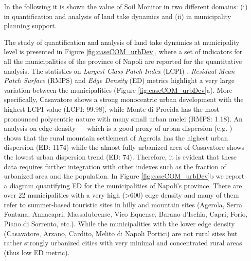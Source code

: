 \documentclass[APA,LATO1COL,doublespace]{WileyNJD-v2}
\begin{document}
In the following it is shown the value of Soil Monitor in two different domains: (i) in quantification and analysis of land take dynamics and (ii) in municipality planning support. 

The study of quantification and analysis of land take dynamics at municipality level is presented in Figure \ref{fig:caseCOM_urbDev}, where a set of indicators for all the municipalities of the province of Napoli are reported for the quantitative analysis.
The statistics on \textit{Largest Class Patch Index} (LCPI) , \textit{Residual Mean Patch Surface} (RMPS) and \textit{Edge Density} (ED) metrics highlight a very large variation between the municipalities (Figure \ref{fig:caseCOM_urbDev}a).
More specifically, Casavatore shows a strong monocentric urban development with the highest LCPI value (LCPI: 99.98), while Monte di Procida has the most pronounced
polycentric nature with many small urban nuclei (RMPS: 1.18).
An analysis on edge density --- which is a good proxy of urban dispersion (e.g. \citealp{SCHWARZ2010}) --- shows that the rural mountain settlement of Agerola has the highest urban dispersion (ED: 1174) while the almost fully urbanized area of Casavatore shows the lowest urban dispersion trend (ED: 74).
Therefore, it is evident that these data requires further integration with other indexes such as the fraction of urbanized area and the population.
In Figure \ref{fig:caseCOM_urbDev}b we report a diagram quantifying ED for the municipalities of Napoli's province.
There are over 22 municipalities with a very high (>600) edge density and many of them refer to summer-based touristic sites in hilly and mountain sites (Agerola, Serra Fontana, Annacapri, Massalubrense, Vico Equense, Barano d'Ischia, Capri, Forio, Piano di Sorrento, etc.).
While the municipalities with the lower edge density (Casavatore, Arzano, Cardito, Melito di Napoli Portici) are not rural sites but rather strongly urbanized cities with very minimal and concentrated rural areas (thus low ED metric).
\end{document}
